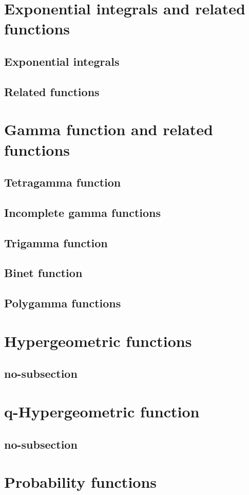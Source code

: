 \documentclass[11pt]{article}
\begin{document}
  \section{Exponential integrals and related functions}
    \subsection{Exponential integrals}

    \subsection{Related functions}

  \section{Gamma function and related functions}
    \subsection{Tetragamma function}

    \subsection{Incomplete gamma functions}

    \subsection{Trigamma function}

    \subsection{Binet function}

    \subsection{Polygamma functions}

  \section{Hypergeometric functions}
    \subsection{no-subsection}

  \section{q-Hypergeometric function}
    \subsection{no-subsection}

  \section{Probability functions}
\end{document}
